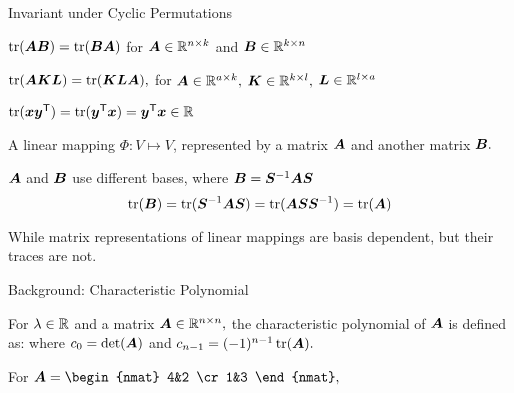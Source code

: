 \documentclass[fleqn,aspectratio=169]{beamer}
\begin{document}
\begin{frame}{Invariant under Cyclic Permutations}

\plitemsep 0.1in

\bci
\item $\operatorname{tr}(\bm{A}\bm{B}) = \operatorname{tr}(\bm{B} \bm{A})$ for $\bm{A} \in {\mathbb R}^{n \times k}$ and $\bm{B} \in {\mathbb R}^{k \times n}$
\item $\operatorname{tr}(\bm{A} \bm{K} \bm{L}) = \operatorname{tr}(\bm{K} \bm{L} \bm{A}),$ for $\bm{A} \in {\mathbb R}^{a \times k},$ $\bm{K} \in {\mathbb R}^{k \times l},$ $\bm{L} \in {\mathbb R}^{l \times a}$
\item $\operatorname{tr}(\bm{x}{\bm{y}}^{\mathsf{T}}) = \operatorname{tr}({\bm{y}}^{\mathsf{T}} \bm{x}) = {\bm{y}}^{\mathsf{T}} \bm{x} \in {\mathbb R}$

\medskip
\item A linear mapping $\Phi: V \mapsto V$, represented by a matrix $\bm{A}$ and another matrix $\bm{B}.$ 
\bci
\item $\bm{A}$ and $\bm{B}$ use different bases, where $\bm{B} = {{\bm{S}}^{-1}} \bm{A} \bm{S}$ 
$$
\operatorname{tr}(\bm{B}) = \operatorname{tr}({{\bm{S}}^{-1}} \bm{A} \bm{S}) = \operatorname{tr}( \bm{A} \bm{S}{{\bm{S}}^{-1}}) = \operatorname{tr}(\bm{A})
$$
\item {} While matrix representations of linear mappings are basis dependent, but their traces are not. 
\eci
\eci
\end{frame}

\begin{frame}{Background: Characteristic Polynomial}

\plitemsep 0.1in

\bci
\item {} For $\lambda \in {\mathbb R}$ and a matrix $\bm{A} \in {\mathbb R}^{n \times n},$ the characteristic polynomial of $\bm{A}$ is defined as:
where $c_0 = \det(\bm{A})$ and $c_{n-1} = (-1)^{n-1}\operatorname{tr}(\bm{A}).$

\item \exam For $\mA = \begin{nmat}
4&2 \cr
1&3
\end{nmat},$ 
\eci
\end{frame}

\end{document}
